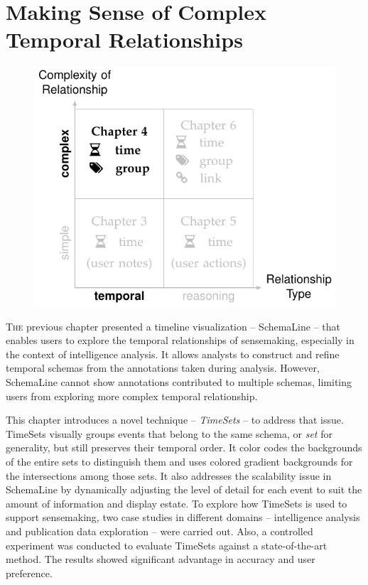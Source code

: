 \chapter{Making Sense of Complex Temporal Relationships}
\label{chap:timesets}

\graphicspath{{Chapter4/figures/}}

\begin{figure}[!h]
	\centering
	\includegraphics{work}
\end{figure}

\vspace{.8in}


\pagebreak

\lettrine{T}{he} previous chapter presented a timeline visualization -- SchemaLine -- that enables users to explore the temporal relationships of sensemaking, especially in the context of intelligence analysis. It allows analysts to construct and refine temporal schemas from the annotations taken during analysis. However, SchemaLine cannot show annotations contributed to multiple schemas, limiting users from exploring more complex temporal relationship.

This chapter introduces a novel technique -- \emph{TimeSets} -- to address that issue. TimeSets visually groups events that belong to the same schema, or \emph{set} for generality, but still preserves their temporal order. It color codes the backgrounds of the entire sets to distinguish them and uses colored gradient backgrounds for the intersections among those sets. It also addresses the scalability issue in SchemaLine by dynamically adjusting the level of detail for each event to suit the amount of information and display estate. To explore how TimeSets is used to support sensemaking, two case studies in different domains -- intelligence analysis and publication data exploration -- were carried out. Also, a controlled experiment was conducted to evaluate TimeSets against a state-of-the-art method. The results showed significant advantage in accuracy and user preference.

